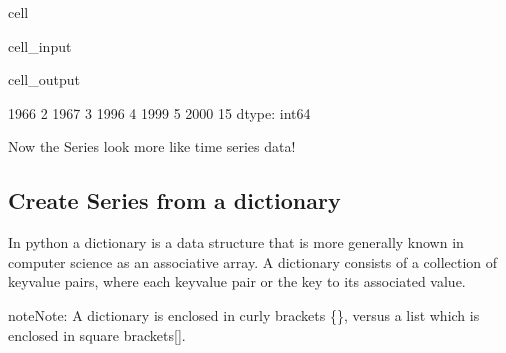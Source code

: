 \documentclass[letterpaper,10pt,english]{jupyterBook}
\begin{document}
\begin{sphinxuseclass}{cell}\begin{sphinxVerbatimInput}

\begin{sphinxuseclass}{cell_input}
\begin{sphinxVerbatim}[commandchars=\\\{\}]
\PYG{p}{[}\PYG{p}{]}
\end{sphinxVerbatim}

\end{sphinxuseclass}\end{sphinxVerbatimInput}
\begin{sphinxVerbatimOutput}

\begin{sphinxuseclass}{cell_output}
\begin{sphinxVerbatim}[commandchars=\\\{\}]
1966     2
1967     3
1996     4
1999     5
2000   \PYGZhy{}15
dtype: int64
\end{sphinxVerbatim}

\end{sphinxuseclass}\end{sphinxVerbatimOutput}

\end{sphinxuseclass}
\sphinxAtStartPar
Now the Series look more like time series data!


\subsection{Create Series from a dictionary}
\label{\detokenize{content/04_PythonEssentials/PythonPackagesEtc:create-series-from-a-dictionary}}
\sphinxAtStartPar
In python a dictionary is a data structure that is more generally known in computer science as an associative array. A dictionary consists of a collection of key\sphinxhyphen{}value pairs, where each key\sphinxhyphen{}value pair  or  the key to its associated value.

\begin{sphinxadmonition}{note}{Note:}
\sphinxAtStartPar
A dictionary is enclosed in curly brackets \{\}, versus a list which is enclosed in square brackets{[}{]}.
\end{sphinxadmonition}
\end{document}
